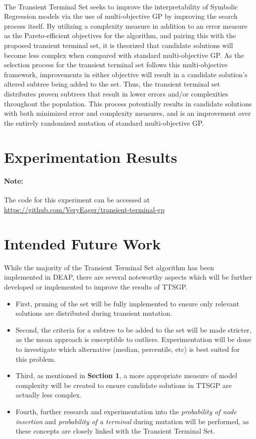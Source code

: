 \documentclass[a4paper]{article}
\begin{document}
\paragraph{} The Transient Terminal Set seeks to improve the interpretability of Symbolic Regression models via the use of multi-objective GP by improving the search process itself. By utilizing a complexity measure in addition to an error measure as the Pareto-efficient objectives for the algorithm, and pairing this with the proposed transient terminal set, it is theorized that candidate solutions will become less complex when compared with standard multi-objective GP. As the selection process for the transient terminal set follows this multi-objective framework, improvements in either objective will result in a candidate solution's altered subtree being added to the set. Thus, the transient terminal set distributes proven subtrees that result in lower errors and/or complexities throughout the population. This process potentially results in candidate solutions with both minimized error and complexity measures, and is an improvement over the entirely randomized mutation of standard multi-objective GP.

\section{Experimentation Results}
\paragraph{Note:} The code for this experiment can be accessed at \url{https://github.com/VeryEager/transient-terminal-gp}

\section{Intended Future Work}
While the majority of the Transient Terminal Set algorithm has been implemented in DEAP, there are several noteworthy aspects which will be further developed or implemented to improve the results of TTSGP. \begin{itemize}
	\item First, pruning of the set will be fully implemented to ensure only relevant solutions are distributed during transient mutation.
	\item Second, the criteria for a subtree to be added to the set will be made stricter, as the mean approach is susceptible to outliers. Experimentation will be done to investigate which alternative (median, percentile, etc) is best suited for this problem.
	\item Third, as mentioned in \textbf{Section 1}, a more appropriate measure of model complexity will be created to ensure candidate solutions in TTSGP are actually less complex.
	\item Fourth, further research and experimentation into the \textit{probability of node insertion} and \textit{probability of a terminal} during mutation will be performed, as these concepts are closely linked with the Transient Terminal Set.
\end{itemize}
\end{document}
